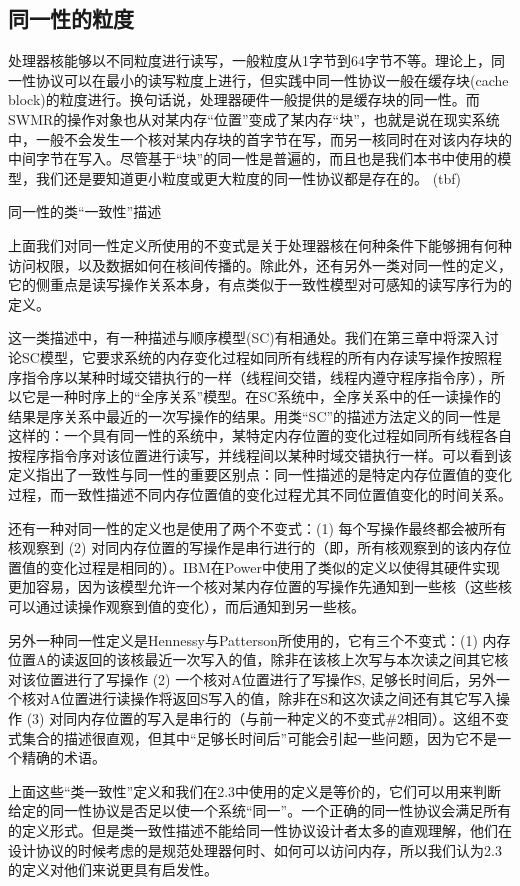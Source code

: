 \documentclass[UTF-8]{ctexrep}
\begin{document}
\subsection{同一性的粒度}
处理器核能够以不同粒度进行读写，一般粒度从1字节到64字节不等。理论上，同一性协议可以在最小的读写粒度上进行，但实践中同一性协议一般在缓存块(cache block)的粒度进行。换句话说，处理器硬件一般提供的是缓存块的同一性。而SWMR的操作对象也从对某内存“位置”变成了某内存“块”，也就是说在现实系统中，一般不会发生一个核对某内存块的首字节在写，而另一核同时在对该内存块的中间字节在写入。尽管基于“块”的同一性是普遍的，而且也是我们本书中使用的模型，我们还是要知道更小粒度或更大粒度的同一性协议都是存在的。
(tbf)
\par 同一性的类“一致性”描述
\par 上面我们对同一性定义所使用的不变式是关于处理器核在何种条件下能够拥有何种访问权限，以及数据如何在核间传播的。除此外，还有另外一类对同一性的定义，它的侧重点是读写操作关系本身，有点类似于一致性模型对可感知的读写序行为的定义。
\par 这一类描述中，有一种描述与顺序模型(SC)有相通处。我们在第三章中将深入讨论SC模型，它要求系统的内存变化过程如同所有线程的所有内存读写操作按照程序指令序以某种时域交错执行的一样（线程间交错，线程内遵守程序指令序），所以它是一种时序上的“全序关系”模型。在SC系统中，全序关系中的任一读操作的结果是序关系中最近的一次写操作的结果。用类“SC”的描述方法定义的同一性是这样的：一个具有同一性的系统中，某特定内存位置的变化过程如同所有线程各自按程序指令序对该位置进行读写，并线程间以某种时域交错执行一样。可以看到该定义指出了一致性与同一性的重要区别点：同一性描述的是特定内存位置值的变化过程，而一致性描述不同内存位置值的变化过程尤其不同位置值变化的时间关系。
\par 还有一种对同一性的定义也是使用了两个不变式：(1) 每个写操作最终都会被所有核观察到  (2) 对同内存位置的写操作是串行进行的（即，所有核观察到的该内存位置值的变化过程是相同的）。IBM在Power中使用了类似的定义以使得其硬件实现更加容易，因为该模型允许一个核对某内存位置的写操作先通知到一些核（这些核可以通过读操作观察到值的变化），而后通知到另一些核。
\par 另外一种同一性定义是Hennessy与Patterson所使用的，它有三个不变式：(1) 内存位置A的读返回的该核最近一次写入的值，除非在该核上次写与本次读之间其它核对该位置进行了写操作 (2)  一个核对A位置进行了写操作S,  足够长时间后，另外一个核对A位置进行读操作将返回S写入的值，除非在S和这次读之间还有其它写入操作  (3) 对同内存位置的写入是串行的（与前一种定义的不变式\#2相同）。这组不变式集合的描述很直观，但其中“足够长时间后”可能会引起一些问题，因为它不是一个精确的术语。
\par 上面这些“类一致性”定义和我们在2.3中使用的定义是等价的，它们可以用来判断给定的同一性协议是否足以使一个系统“同一”。一个正确的同一性协议会满足所有的定义形式。但是类一致性描述不能给同一性协议设计者太多的直观理解，他们在设计协议的时候考虑的是规范处理器何时、如何可以访问内存，所以我们认为2.3的定义对他们来说更具有启发性。
\end{document}
